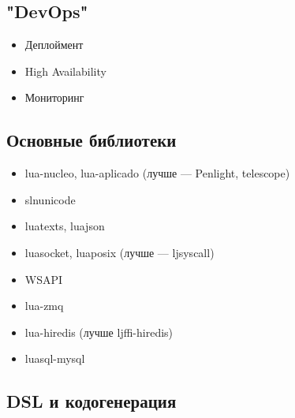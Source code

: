 \documentclass[aspectratio=169,handout,bigger]{beamer}
\begin{document}
\subsection*{"DevOps"}

\begin{frame}
  \begin{itemize}
    \item Деплоймент
    \item High Availability
    \item Мониторинг
  \end{itemize}
\end{frame}


\subsection*{Основные библиотеки}

\begin{frame}
  \begin{itemize}
    \item lua-nucleo, lua-aplicado (лучше — Penlight, telescope)
    \item slnunicode
    \item luatexts, luajson
    \item luasocket, luaposix (лучше — ljsyscall)
    \item WSAPI
    \item lua-zmq
    \item lua-hiredis (лучше ljffi-hiredis)
    \item luasql-mysql
  \end{itemize}
\end{frame}


\subsection*{DSL и кодогенерация}
\end{document}
